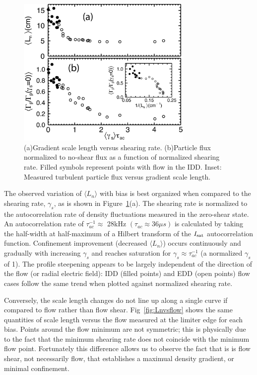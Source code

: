 \documentclass[aip,pop,amsmath,amssymb,preprint,superscriptaddress]{revtex4-1} %
\begin{document}
\begin{figure}[!htbp]
\centerline{
\includegraphics[width=8.5cm]{figure3.eps}}
\caption{\label{fig:sheargradflux} (a)Gradient scale length versus shearing rate. (b)Particle flux normalized to no-shear
  flux as a function of normalized shearing rate. Filled symbols
  represent points with flow in the IDD. Inset: Measured turbulent particle flux versus
  gradient scale length.}
\end{figure}

The observed variation of $\langle L_{n} \rangle$ with bias is best
organized when compared to the shearing rate, $\gamma_{s}$, as is
shown in Figure~\ref{fig:sheargradflux}(a).   The shearing rate is
normalized to the autocorrelation rate of density fluctuations
measured in the zero-shear state.  An autocorrelation rate of $\tau_{ac}^{-1} \approx $ 28kHz $(\tau_{ac} \approx 36\mu s)$ is calculated by taking the half-width at half-maximum of a Hilbert transform of the $I_{\rm sat}$
autocorrelation function.  Confinement improvement (decreased $\langle
L_n \rangle$) occurs continuously and gradually with increasing
$\gamma_{s}$ and reaches saturation for $\gamma_{s} \approx \tau_{ac}^{-1}$ (a normalized $\gamma_{s}$ of 1).  The profile steepening
appears to be largely independent of the direction of the flow (or radial electric field): IDD (filled points) and EDD (open points) flow cases follow the same trend when plotted against normalized shearing rate.

Conversely, the scale length changes do not line up along a single curve if compared to flow rather than flow shear. Fig~\ref{fig:Lnvsflow} shows the same quantities of scale length versus the flow measured at the limiter edge for each bias. Points around the flow minimum are not symmetric; this is physically due to the fact that the minimum shearing rate does not coincide with the minimum flow point. Fortunately this difference allows us to observe the fact that is is flow shear, not necessarily flow, that establishes a maximual density gradient, or minimal confinement.
\end{document}
